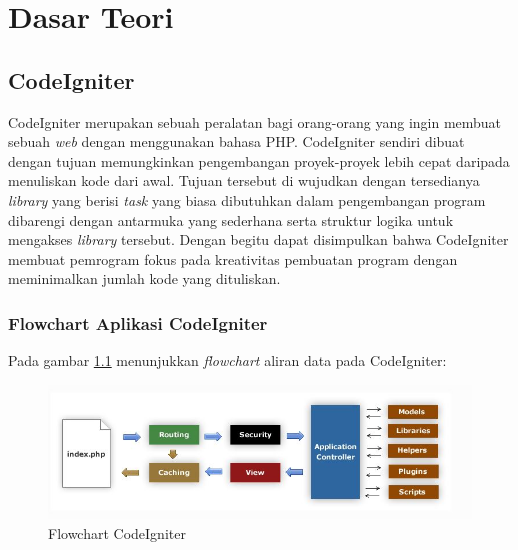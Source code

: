 \chapter{Dasar Teori}
\label{chap: dasarTeori}
	
\section{CodeIgniter}
\label{sec: codeigniter}

CodeIgniter\cite{ciDocs} merupakan sebuah peralatan bagi orang-orang yang ingin membuat sebuah \textit{web} dengan menggunakan bahasa PHP. CodeIgniter sendiri dibuat dengan tujuan memungkinkan pengembangan proyek-proyek lebih cepat daripada menuliskan kode dari awal. Tujuan tersebut di wujudkan dengan tersedianya \textit{library} yang berisi \textit{task} yang biasa dibutuhkan dalam pengembangan program dibarengi dengan antarmuka yang sederhana serta struktur logika untuk mengakses \textit{library} tersebut. Dengan begitu dapat disimpulkan bahwa CodeIgniter membuat pemrogram fokus pada kreativitas pembuatan program dengan meminimalkan jumlah kode yang dituliskan.

\subsection{Flowchart Aplikasi CodeIgniter}
\label{sub: FlowAppCI}

Pada gambar \ref{fig:flowchartCI} menunjukkan \textit{flowchart} aliran data pada CodeIgniter:
\begin{figure}[H]
	\centering
	\includegraphics[scale=0.75]{Gambar/flowChartCI}
	\caption{Flowchart CodeIgniter}
	\label{fig:flowchartCI}
\end{figure}

